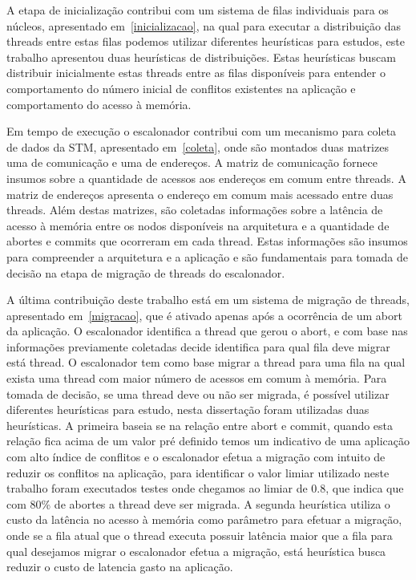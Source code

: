 \documentclass[diss,capa]{texufpel}
\begin{document}
A etapa de inicialização contribui com um sistema de filas individuais para os núcleos, apresentado em~\ref{inicializacao}, na qual para executar a distribuição das threads entre estas filas podemos utilizar diferentes heurísticas para estudos, este trabalho apresentou duas heurísticas de distribuições. Estas heurísticas buscam distribuir inicialmente estas threads entre as filas disponíveis para entender o comportamento do número inicial de conflitos existentes na aplicação e comportamento do acesso à memória.

Em tempo de execução o escalonador contribui com um mecanismo para coleta de dados da STM, apresentado em~\ref{coleta}, onde são montados duas matrizes uma de comunicação e uma de endereços. A matriz de comunicação fornece insumos sobre a quantidade de acessos aos endereços em comum entre threads. A matriz de endereços apresenta o endereço em comum mais acessado entre duas threads. Além destas matrizes, são coletadas informações sobre a latência de acesso à memória entre os nodos disponíveis na arquitetura e a quantidade de abortes e commits que ocorreram em cada thread. Estas informações são insumos para compreender a arquitetura e a aplicação e são fundamentais para tomada de decisão na etapa de migração de threads do escalonador.

A última contribuição deste trabalho está em um sistema de migração de threads, apresentado em~\ref{migracao}, que é ativado apenas após a ocorrência de um abort da aplicação. O escalonador identifica a thread que gerou o abort, e com base nas informações previamente coletadas decide identifica para qual fila deve migrar está thread. O escalonador tem como base migrar a thread para uma fila na qual exista uma thread com maior número de acessos em comum à memória. Para tomada de decisão, se uma thread deve ou não ser migrada, é possível utilizar diferentes heurísticas para estudo, nesta dissertação foram utilizadas duas heurísticas. A primeira baseia se na relação entre abort e commit, quando esta relação fica acima de um valor pré definido temos um indicativo de uma aplicação com alto índice de conflitos e o escalonador efetua a migração com intuito de reduzir os conflitos na aplicação, para identificar o valor limiar utilizado neste trabalho foram executados testes onde chegamos ao limiar de 0.8, que indica que com 80\% de abortes a thread deve ser migrada. A segunda heurística utiliza o custo da latência no acesso à memória como parâmetro para efetuar a migração, onde se a fila atual que o thread executa possuir latência maior que a fila para qual desejamos migrar o escalonador efetua a migração, está heurística busca reduzir o custo de latencia gasto na aplicação.
\end{document}
